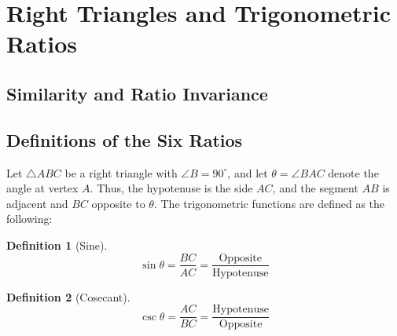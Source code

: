 \documentclass{article}
\theoremstyle{definition}
\newtheorem{definition}{Definition}[]
\theoremstyle{plain}
\begin{document}
\section{Right Triangles and Trigonometric Ratios}

\subsection{Similarity and Ratio Invariance}

\subsection{Definitions of the Six Ratios}

\begin{center}
\end{center}

Let $\triangle ABC$ be a right triangle with $\angle B = 90^\circ$, and let $\theta = \angle BAC$ denote the angle at vertex $A$. Thus, the hypotenuse is the side $AC$, and the segment $AB$ is adjacent and $BC$ opposite to $\theta$. The trigonometric functions are defined as the following:

\vspace{0.5em}

\noindent
\begin{minipage}[t]{0.48\textwidth}
    \begin{definition}[Sine]
        \[
        \sin \theta = \frac{BC}{AC} = \frac{\text{Opposite}}{\text{Hypotenuse}}
        \]
    \end{definition}
\end{minipage}
\hfill
\begin{minipage}[t]{0.48\textwidth}
    \begin{definition}[Cosecant]
        \[
        \csc \theta = \frac{AC}{BC} = \frac{\text{Hypotenuse}}{\text{Opposite}}
        \]
    \end{definition}
\end{minipage}
\end{document}
